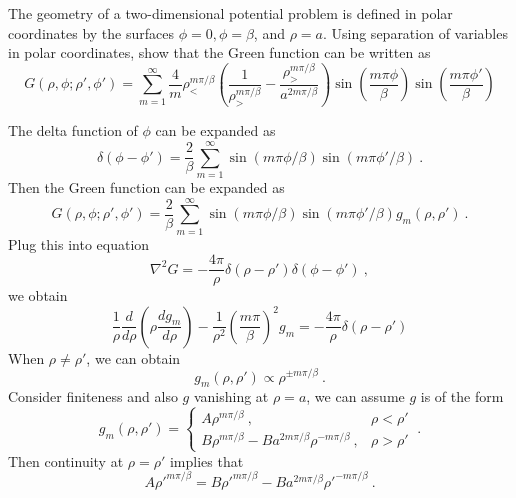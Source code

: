 \documentclass[12pt]{article}
\newcommand{\lb}{\left(}
\newcommand{\rb}{\right)}
\newcommand{\mb}{{m \pi/\beta}}
\begin{document}
\newpage
{} The geometry of a two-dimensional potential problem is defined in polar coordinates by the surfaces $\phi = 0, \phi = \beta$, and $\rho = a$. Using separation of variables in polar coordinates, show that the Green function can be written as
\begin{equation}
    G(\rho, \phi; \rho', \phi') = \sum_{m=1}^\infty \frac{4}{m} \rho_<^{m \pi / \beta} \lb \frac{1}{\rho_>^{\mb}}  - \frac{\rho_>^\mb}{a^{2\mb}} \rb \sin\lb \frac{m \pi \phi}{\beta} \rb \sin \lb \frac{m \pi \phi'}{\beta}\rb
\end{equation}

\newpage
{} The delta function of $\phi$ can be expanded as
\begin{equation}
    \delta(\phi - \phi') = \frac{2}{\beta} \sum_{m = 1}^\infty \sin(m \pi \phi/\beta) \sin(m \pi \phi'/\beta)~.
\end{equation}
Then the Green function can be expanded as
\begin{equation}
    \boxed{
    G(\rho, \phi; \rho', \phi') = \frac{2}{\beta}\sum_{m =1}^\infty \sin(m \pi \phi/\beta) \sin(m \pi \phi'/\beta) g_m(\rho, \rho')~.
    }
\end{equation}
Plug this into equation
\begin{equation}
    \nabla^2 G = - \frac{4\pi}{\rho} \delta(\rho - \rho') \delta(\phi - \phi')~,
\end{equation}
we obtain
\begin{equation}
    \frac{1}{\rho} \frac{d}{d\rho} \lb\rho \frac{d g_m}{d\rho}\rb - \frac{1}{\rho^2} \lb \frac{m \pi}{\beta}\rb^2 g_m = - \frac{4\pi}{\rho} \delta(\rho - \rho')
\end{equation}
When $\rho \neq \rho'$, we can obtain
\begin{equation}
    g_m(\rho, \rho') \propto \rho^{\pm\mb}~.
\end{equation}
Consider finiteness and also $g$ vanishing at $\rho = a$, we can assume $g$ is of the form
\begin{equation}
    g_m(\rho, \rho') = \begin{cases}
        A \rho^{\mb}~, & \rho < \rho'\\
        B \rho^{\mb} - B a^{2\mb}\rho^{-\mb}~, & \rho > \rho'
    \end{cases}~.
\end{equation}
Then continuity at $\rho = \rho'$ implies that
\begin{equation}
    A\rho'^\mb = B \rho'^{\mb} - B a^{2\mb}\rho'^{-\mb}~.
\end{equation}
\end{document}
